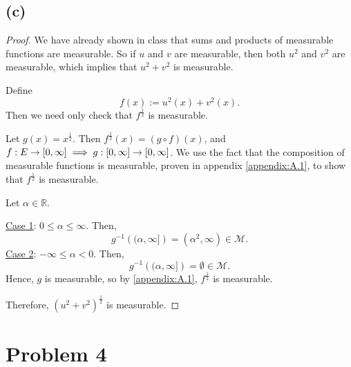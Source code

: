 \documentclass{article}
\newcommand{\R}{\mathbb{R}} %
\newcommand{\M}{\mathcal{M}} %
\begin{document}
\subsection*{(c)}
\begin{proof}
	We have already shown in class that sums and products of measurable functions are measurable. So if $u$ and $v$ are measurable, then both $u^2$ and $v^2$ are measurable, which implies that $u^2 + v^2$ is measurable.
	
	Define
	\begin{equation}
		f(x) := u^2(x) + v^2(x).
	\end{equation}
	Then we need only check that $f^{\frac{1}{2}}$ is measurable.
	
	Let $g(x) = x^{\frac{1}{2}}$. Then $f^{\frac{1}{2}}(x) = (g \circ f)(x)$, and $f: E \rightarrow [0,\infty] \\ \implies g: [0, \infty] \rightarrow [0, \infty]$. We use the fact that the composition of measurable functions is measurable, proven in appendix \ref{appendix:A.1}, to show that $f^{\frac{1}{2}}$ is measurable. 
	
	Let $\alpha \in \R$.
	
	\underline{Case 1}: $0 \leq \alpha \leq \infty$. Then,
	\begin{equation}
		g^{-1}\left((\alpha, \infty]\right) = (\alpha^2, \infty) \in \M.
	\end{equation}
	\underline{Case 2}: $-\infty \leq \alpha < 0$. Then,
	\begin{equation}
		g^{-1}\left((\alpha, \infty]\right) = \emptyset \in \M.
	\end{equation}
	Hence, $g$ is measurable, so by \ref{appendix:A.1}, $f^{\frac{1}{2}}$ is measurable.
	
	Therefore, $(u^2 + v^2)^{\frac{1}{2}}$ is measurable.
\end{proof}
\section*{Problem 4}
\end{document}
